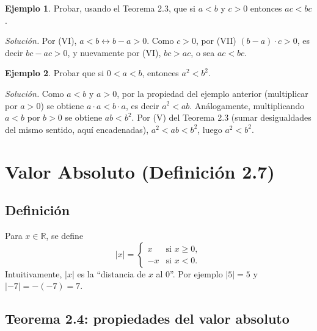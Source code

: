 \documentclass[11pt]{article}
\theoremstyle{plain}
\theoremstyle{definition}
\newtheorem{ejemplo}{Ejemplo}
\begin{document}
\begin{ejemplo}
Probar, usando el Teorema 2.3, que si $a<b$ y $c>0$ entonces $ac < bc$.

\emph{Solución.} Por (VI), $a<b \leftrightarrow b-a>0$. Como $c>0$, por (VII) $(b-a)\cdot c>0$, es decir
$bc-ac>0$, y nuevamente por (VI), $bc>ac$, o sea $ac<bc$.
\end{ejemplo}

\begin{ejemplo}
Probar que si $0<a<b$, entonces $a^2<b^2$.

\emph{Solución.} Como $a<b$ y $a>0$, por la propiedad del ejemplo anterior (multiplicar por $a>0$)
se obtiene $a\cdot a < b\cdot a$, es decir $a^2<ab$. Análogamente, multiplicando $a<b$ por $b>0$ se
obtiene $ab<b^2$. Por (V) del Teorema 2.3 (sumar desigualdades del mismo sentido, aquí encadenadas),
$a^2 < ab < b^2$, luego $a^2<b^2$.
\end{ejemplo}

\section{Valor Absoluto (Definición 2.7)}

\subsection{Definición}

Para $x \in \mathbb{R}$, se define
\[
  |x| = \begin{cases} x & \text{si } x \ge 0, \\ -x & \text{si } x<0. \end{cases}
\]
Intuitivamente, $|x|$ es la ``distancia de $x$ al $0$''. Por ejemplo $|5|=5$ y $|-7|=-(-7)=7$.

\subsection{Teorema 2.4: propiedades del valor absoluto}
\end{document}
